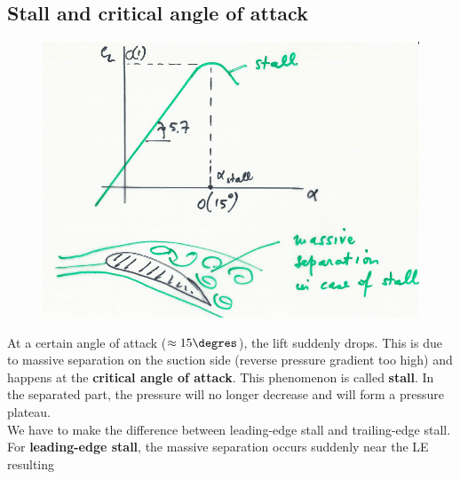 		\subsection{Stall and critical angle of attack}
			\begin{figure}
			\vspace{-5mm}
			\includegraphics[scale=0.16]{ch2/18}
			\end{figure}
			At a certain angle of attack ($\approx 15\degres$), the lift suddenly drops. This is due to massive separation on the suction side (reverse pressure gradient too high) and happens at the \textbf{critical angle of attack}. This phenomenon is called \textbf{stall}. In the separated part, the pressure will no longer decrease and will form a pressure plateau. \\
			
			We have to make the difference between leading-edge stall and trailing-edge stall. For \textbf{leading-edge stall}, the massive separation occurs suddenly near the LE resulting \newpage
			
